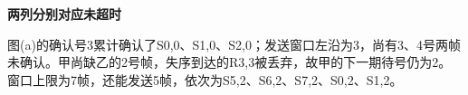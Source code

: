 {\color{ink}\bfseries 两列分别对应未超时}\par\vspace{1bp}图(a)的确认号3累计确认了S0,\allowbreak{}0、S1,\allowbreak{}0、S2,\allowbreak{}0；发送窗口左沿为3，尚有3、4号两帧未确认。甲尚缺乙的2号帧，失序到达的R3,\allowbreak{}3被丢弃，故甲的下一期待号仍为2。窗口上限为7帧，还能发送5帧，依次为S5,\allowbreak{}2、S6,\allowbreak{}2、S7,\allowbreak{}2、S0,\allowbreak{}2、S1,\allowbreak{}2。
